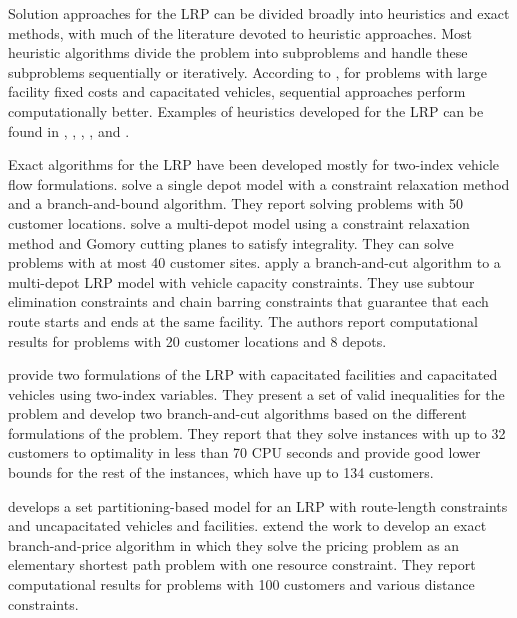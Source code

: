 \documentclass[11pt]{article}
\begin{document}
Solution approaches for the LRP can be divided broadly into heuristics
and exact methods, with much of the literature devoted to heuristic
approaches. Most heuristic algorithms divide the problem into
subproblems and handle these subproblems sequentially or iteratively.
According to \citet{Min2}, for problems with large facility fixed costs and 
capacitated vehicles, sequential approaches perform computationally better. 
Examples of heuristics developed for the LRP can be found in
\citet{Perl}, \citet{Hansen}, \citet{Barreto07}, \citet{Srivastava},
\citet{Albareda-Sambola} and \citet{Prins}.

Exact algorithms for the LRP have been developed mostly for two-index vehicle flow 
formulations. \citet{Laporte81} solve a single depot model with a constraint relaxation 
method and a branch-and-bound algorithm. They report solving problems with 50 customer 
locations. \citet{Laporte83} solve a multi-depot model using a constraint relaxation 
method and Gomory cutting planes to satisfy integrality. They can solve problems with 
at most 40 customer sites. \citet{Laporte86} apply a branch-and-cut algorithm to a 
multi-depot LRP model with vehicle capacity constraints. They use subtour elimination 
constraints and chain barring constraints that guarantee that each route starts and 
ends at the same facility. The authors report computational results for problems with 20
customer locations and 8 depots. 

\citet{Belenguer06} provide two formulations of
the LRP with capacitated facilities and capacitated vehicles
using two-index variables. They 
present a set of valid inequalities for the problem and develop
two branch-and-cut algorithms based on the different formulations of the
problem. They report that they solve instances with up to
32 customers to optimality in less than 70 CPU seconds and provide
good lower bounds for the rest of the instances, which have up to 134
customers.

\citet{Berger} develops a set partitioning-based model for an LRP with route-length 
constraints and uncapacitated vehicles and facilities. \citet{Berger07} extend the work to 
develop an exact branch-and-price algorithm in which they solve the pricing problem as an
elementary shortest path problem with one resource constraint. They report computational 
results for problems with 100 customers and various distance constraints. 
\end{document}
